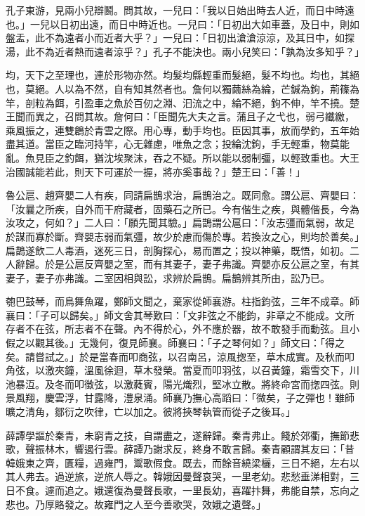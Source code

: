 \begin{pinyinscope}
孔子東游，見兩小兒辯鬭。問其故，一兒曰：「我以日始出時去人近，而日中時遠也。」一兒以日初出遠，而日中時近也。一兒曰：「日初出大如車蓋，及日中，則如盤盂，此不為遠者小而近者大乎？」一兒曰：「日初出滄滄涼涼，及其日中，如探湯，此不為近者熱而遠者涼乎？」孔子不能決也。兩小兒笑曰：「孰為汝多知乎？」

均，天下之至理也，連於形物亦然。均髮均縣輕重而髮絕，髮不均也。均也，其絕也，莫絕。人以為不然，自有知其然者也。詹何以獨繭絲為綸，芒鍼為鉤，荊篠為竿，剖粒為餌，引盈車之魚於百仞之淵、汩流之中，綸不絕，鉤不伸，竿不撓。楚王聞而異之，召問其故。詹何曰：「臣聞先大夫之言。蒲且子之弋也，弱弓纖繳，乘風振之，連雙鶬於青雲之際。用心專，動手均也。臣因其事，放而學釣，五年始盡其道。當臣之臨河持竿，心无雜慮，唯魚之念；投綸沈鉤，手无輕重，物莫能亂。魚見臣之釣餌，猶沈埃聚沫，吞之不疑。所以能以弱制彊，以輕致重也。大王治國誠能若此，則天下可運於一握，將亦奚事哉？」楚王曰：「善！」

魯公扈、趙齊嬰二人有疾，同請扁鵲求治，扁鵲治之。既同愈。謂公扈、齊嬰曰：「汝曩之所疾，自外而干府藏者，固藥石之所已。今有偕生之疾，與體偕長，今為汝攻之，何如？」二人曰：「願先聞其驗。」扁鵲謂公扈曰：「汝志彊而氣弱，故足於謀而寡於斷。齊嬰志弱而氣彊，故少於慮而傷於專。若換汝之心，則均於善矣。」扁鵲遂飲二人毒酒，迷死三日，剖胸探心，易而置之；投以神藥，既悟，如初。二人辭歸。於是公扈反齊嬰之室，而有其妻子，妻子弗識。齊嬰亦反公扈之室，有其妻子，妻子亦弗識。二室因相與訟，求辨於扁鵲。扁鵲辨其所由，訟乃已。

匏巴鼓琴，而鳥舞魚躍，鄭師文聞之，棄家從師襄游。柱指鈞弦，三年不成章。師襄曰：「子可以歸矣。」師文舍其琴歎曰：「文非弦之不能鈞，非章之不能成。文所存者不在弦，所志者不在聲。內不得於心，外不應於器，故不敢發手而動弦。且小假之以觀其後。」无幾何，復見師襄。師襄曰：「子之琴何如？」師文曰：「得之矣。請嘗試之。」於是當春而叩商弦，以召南呂，涼風揔至，草木成實。及秋而叩角弦，以激夾鐘，溫風徐迴，草木發榮。當夏而叩羽弦，以召黃鐘，霜雪交下，川池暴沍。及冬而叩徵弦，以激蕤賓，陽光熾烈，堅冰立散。將終命宮而揔四弦。則景風翔，慶雲浮，甘露降，澧泉涌。師襄乃撫心高蹈曰：「微矣，子之彈也！雖師曠之清角，鄒衍之吹律，亡以加之。彼將挾琴執管而從子之後耳。」

薛譚學謳於秦青，未窮青之技，自謂盡之，遂辭歸。秦青弗止。餞於郊衢，撫節悲歌，聲振林木，響遏行雲。薛譚乃謝求反，終身不敢言歸。秦青顧謂其友曰：「昔韓娥東之齊，匱糧，過雍門，鬻歌假食。既去，而餘音繞梁欐，三日不絕，左右以其人弗去。過逆旅，逆旅人辱之。韓娥因曼聲哀哭，一里老幼。悲愁垂涕相對，三日不食。遽而追之。娥還復為曼聲長歌，一里長幼，喜躍抃舞，弗能自禁，忘向之悲也。乃厚賂發之。故雍門之人至今善歌哭，效娥之遺聲。」


\end{pinyinscope}
